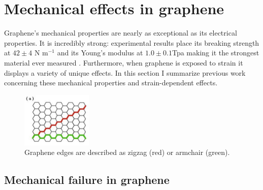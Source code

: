 \documentclass[edeposit,fullpage,draftthesis]{uiucthesis2009}
\begin{document}
        
        
    \section{Mechanical effects in graphene}
    
        Graphene's mechanical properties are nearly as exceptional as its electrical properties. It is incredibly
        strong: experimental results place its breaking strength at $42 \pm 4$ N m$^{-1}$ and its
        Young's modulus at $1.0 \pm 0.1 $Tpa making it the strongest material ever measured \cite{Lee2008}.
        Furthermore, when graphene is exposed to strain it displays a variety of unique effects. 
        In this section I summarize previous work concerning these mechanical properties and
        strain-dependent effects.
      
            \begin{figure}
            \centering
            \includegraphics[width=0.3\textwidth]{images/background/zigzag_armchair.png}
            \caption[Armchair and zigzag edges in graphene]{
            Graphene edges are described as zigzag (red) or armchair (green).
            }
            \label{fig:zigzag_armchair}
            \end{figure}
        
        \subsection{Mechanical failure in graphene}
        
\end{document}
